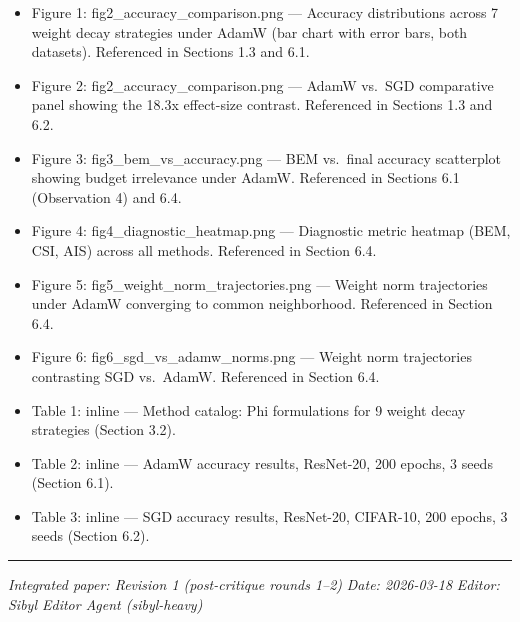 \documentclass[
]{article}
\providecommand{\tightlist}{%
  \setlength{\itemsep}{0pt}\setlength{\parskip}{0pt}}
\begin{document}
\begin{itemize}
\tightlist
\item
  Figure 1: fig2\_accuracy\_comparison.png --- Accuracy distributions
  across 7 weight decay strategies under AdamW (bar chart with error
  bars, both datasets). Referenced in Sections 1.3 and 6.1.
\item
  Figure 2: fig2\_accuracy\_comparison.png --- AdamW vs.~SGD comparative
  panel showing the 18.3x effect-size contrast. Referenced in Sections
  1.3 and 6.2.
\item
  Figure 3: fig3\_bem\_vs\_accuracy.png --- BEM vs.~final accuracy
  scatterplot showing budget irrelevance under AdamW. Referenced in
  Sections 6.1 (Observation 4) and 6.4.
\item
  Figure 4: fig4\_diagnostic\_heatmap.png --- Diagnostic metric heatmap
  (BEM, CSI, AIS) across all methods. Referenced in Section 6.4.
\item
  Figure 5: fig5\_weight\_norm\_trajectories.png --- Weight norm
  trajectories under AdamW converging to common neighborhood. Referenced
  in Section 6.4.
\item
  Figure 6: fig6\_sgd\_vs\_adamw\_norms.png --- Weight norm trajectories
  contrasting SGD vs.~AdamW. Referenced in Section 6.4.
\item
  Table 1: inline --- Method catalog: Phi formulations for 9 weight
  decay strategies (Section 3.2).
\item
  Table 2: inline --- AdamW accuracy results, ResNet-20, 200 epochs, 3
  seeds (Section 6.1).
\item
  Table 3: inline --- SGD accuracy results, ResNet-20, CIFAR-10, 200
  epochs, 3 seeds (Section 6.2).
\end{itemize}

\begin{center}\rule{0.5\linewidth}{0.5pt}\end{center}

\emph{Integrated paper: Revision 1 (post-critique rounds 1--2)}
\emph{Date: 2026-03-18} \emph{Editor: Sibyl Editor Agent (sibyl-heavy)}
\end{document}
